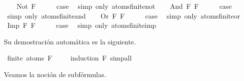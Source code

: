 \begin{isabellebody}
\isamarkupfalse%
\isanewline
\ \ \isamarkupfalse%
\ {\isacharparenleft}Not\ F{\isacharparenright}\isanewline
\ \ \isamarkupfalse%
\ \isamarkupfalse%
\ {\isacharquery}case\ \isamarkupfalse%
\ {\isacharparenleft}simp\ only{\isacharcolon}\ atoms{\isacharunderscore}finite{\isacharunderscore}not{\isacharparenright}\isanewline
{}\isamarkupfalse%
\isanewline
\ \ \isamarkupfalse%
\ {\isacharparenleft}And\ F{}\ F{}{\isacharparenright}\isanewline
\ \ \isamarkupfalse%
\ \isamarkupfalse%
\ {\isacharquery}case\ \isamarkupfalse%
\ {\isacharparenleft}simp\ only{\isacharcolon}\ atoms{\isacharunderscore}finite{\isacharunderscore}and{\isacharparenright}\isanewline
{}\isamarkupfalse%
\isanewline
\ \ \isamarkupfalse%
\ {\isacharparenleft}Or\ F{}\ F{}{\isacharparenright}\isanewline
\ \ \isamarkupfalse%
\ \isamarkupfalse%
\ {\isacharquery}case\ \isamarkupfalse%
\ {\isacharparenleft}simp\ only{\isacharcolon}\ atoms{\isacharunderscore}finite{\isacharunderscore}or{\isacharparenright}\isanewline
{}\isamarkupfalse%
\isanewline
\ \ \isamarkupfalse%
\ {\isacharparenleft}Imp\ F{}\ F{}{\isacharparenright}\isanewline
\ \ \isamarkupfalse%
\ \isamarkupfalse%
\ {\isacharquery}case\ \isamarkupfalse%
\ {\isacharparenleft}simp\ only{\isacharcolon}\ atoms{\isacharunderscore}finite{\isacharunderscore}imp{\isacharparenright}\isanewline
{}\isamarkupfalse%
%
\endisatagproof
{\isafoldproof}%
%
\isadelimproof
%
\endisadelimproof
%
\begin{isamarkuptext}%
Su demostración automática es la siguiente.%
\end{isamarkuptext}\isamarkuptrue%
\isamarkupfalse%
\ {\isachardoublequoteopen}finite\ {\isacharparenleft}atoms\ F{\isacharparenright}{\isachardoublequoteclose}\ \isanewline
%
\isadelimproof
\ \ %
\endisadelimproof
%
\isatagproof
{}\isamarkupfalse%
\ {\isacharparenleft}induction\ F{\isacharparenright}\ simp{\isacharunderscore}all%
\endisatagproof
{\isafoldproof}%
%
\isadelimproof
%
\endisadelimproof
%
\isadelimdocument
%
\endisadelimdocument
%
\isatagdocument
%
\isamarkuptrue%
%
\endisatagdocument
{\isafolddocument}%
%
\isadelimdocument
%
\endisadelimdocument
%
\begin{isamarkuptext}%
Veamos la noción de subfórmulas.


\end{isamarkuptext}
\end{isabellebody}

